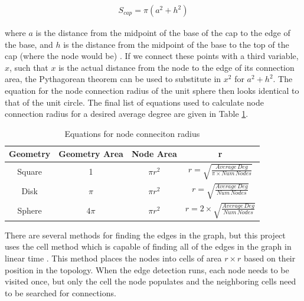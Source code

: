 \documentclass{article}
\begin{document}
        \begin{align}
            S_{cap} = \pi (a^2 + h^2)
        \end{align}

        where $a$ is the distance from the midpoint of the base of the cap to the edge of the base, and $h$ is the distance from the midpoint of the base to the top of the cap (where the node would be) \cite{spherecap}. If we connect these points with a third variable, $x$, such that $x$ is the actual distance from the node to the edge of its connection area, the Pythagorean theorem can be used to substitute in $x^2$ for $a^2 + h^2$. The equation for the node connection radius of the unit sphere then looks identical to that of the unit circle. The final list of equations used to calculate node connection radius for a desired average degree are given in Table \ref{tab4}.

        \begin{center}
            \begin{table}[h]
                \centering
                \begin{tabular}{|c|c|c|c|}
                    \hline
                    Geometry & Geometry Area & Node Area & r \\
                    \hline
                    Square & 1 & $\pi r^2$ & $r = \sqrt{\frac{Average\,Deg}{\pi \times Num\,Nodes}}$ \\
                    Disk & $\pi$ & $\pi r^2$ & $r = \sqrt{\frac{Average\,Deg}{Num\,Nodes}}$ \\
                    Sphere & $4\pi$ & $\pi r^2$ & $r = 2 \times \sqrt{\frac{Average\,Deg}{Num\,Nodes}}$ \\
                    \hline
                \end{tabular}

                \caption{Equations for node conneciton radius}
                \label{tab4}
            \end{table}
        \end{center}

        There are several methods for finding the edges in the graph, but this project uses the cell method which is capable of finding all of the edges in the graph in linear time \cite{rggpartition}. This method places the nodes into cells of area $r \times r$ based on their position in the topology. When the edge detection runs, each node needs to be visited once, but only the cell the node populates and the neighboring cells need to be searched for connections.
\end{document}
